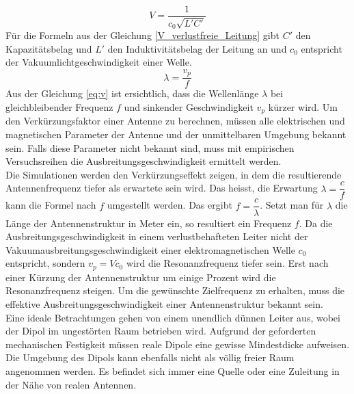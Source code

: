 \begin{equation}\label{V_verlustfreie_Leitung}
V=\dfrac{1}{c_0 \sqrt{L'C'}} 
\end{equation}
Für die Formeln aus der Gleichung \ref{V_verlustfreie_Leitung} gibt $C'$  den Kapazitätsbelag und $L'$ den Induktivitätsbelag  der Leitung an und $c_0$ entspricht der Vakuumlichtgeschwindigkeit einer Welle.
\begin{equation}\label{eq:v}
\lambda=\dfrac{v_p}{f}
\end{equation}  
Aus der Gleichung \ref{eq:v}  ist ersichtlich, dass die Wellenlänge $\lambda$ bei gleichbleibender Frequenz $f$ und sinkender Geschwindigkeit $v_p$ kürzer wird. 
Um den Verkürzungsfaktor einer Antenne zu berechnen, müssen alle elektrischen und magnetischen Parameter der Antenne und der unmittelbaren Umgebung bekannt sein. Falls diese Parameter  nicht bekannt sind, muss mit empirischen Versuchsreihen die Ausbreitungsgeschwindigkeit ermittelt werden.\\

Die Simulationen werden den Verkürzungseffekt zeigen, in dem die resultierende Antennenfrequenz tiefer als erwartete sein wird. Das heisst, die Erwartung $\lambda = \dfrac{c}{f}$ kann die Formel nach $f$ umgestellt werden. Das ergibt $f=\dfrac{c}{\lambda}$. Setzt man für $\lambda$ die Länge der Antennenstruktur in Meter ein, so resultiert ein Frequenz $f$. Da die Ausbreitungsgeschwindigkeit in einem verlustbehafteten Leiter nicht der Vakuumausbreitungsgeschwindigkeit einer elektromagnetischen Welle $c_0$ entspricht, sondern $v_p=V c_0$ wird die Resonanzfrequenz tiefer sein. Erst nach einer Kürzung der Antennenstruktur um einige Prozent wird die Resonanzfrequenz steigen. Um die gewünschte Zielfrequenz zu erhalten, muss die effektive Ausbreitungsgeschwindigkeit einer Antennenstruktur bekannt sein.\\

Eine ideale Betrachtungen gehen von einem unendlich dünnen Leiter aus, wobei der Dipol im ungestörten Raum betrieben wird. Aufgrund der geforderten mechanischen Festigkeit müssen reale Dipole eine gewisse Mindestdicke aufweisen. Die Umgebung des Dipols kann ebenfalls nicht als völlig freier Raum angenommen werden. Es befindet sich immer eine Quelle oder eine Zuleitung in der Nähe von realen Antennen. \\


